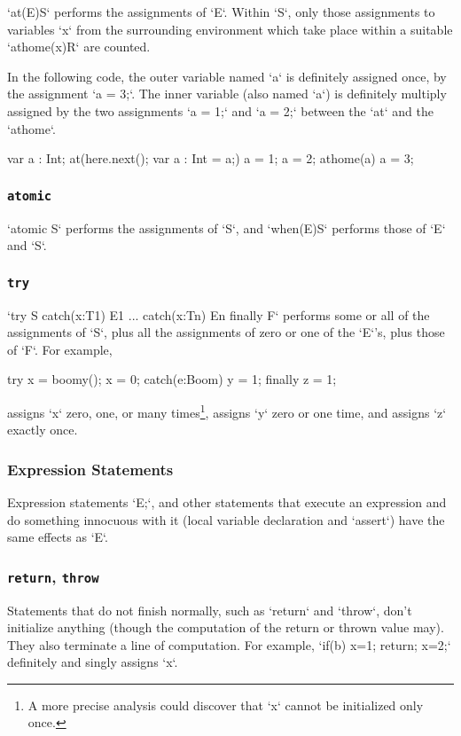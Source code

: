 \xcd`at(E)S` performs the assignments of \xcd`E`. Within \xcd`S`, only those
assignments to variables \xcd`x` from the surrounding environment which take
place within a suitable \xcd`athome(x)R` are counted. 

\begin{ex}
In the following code, the outer variable named \xcd`a` is definitely assigned
once, by the assignment \xcd`a = 3;`.  The inner variable (also named \xcd`a`)
is definitely multiply assigned 
by the two assignments \xcd`a = 1;` and \xcd`a = 2;` 
between the \xcd`at` and the \xcd`athome`.  
\begin{xten}
var a : Int;
at(here.next(); var a : Int = a;) {
  a = 1;
  a = 2; 
  athome(a) a = 3;
}
\end{xten}

\end{ex}

\subsubsection{{\tt atomic}}

\xcd`atomic S` performs the assignments of \xcd`S`, 
and \xcd`when(E)S` performs those of \xcd`E` and \xcd`S`.  

\subsubsection{{\tt try}}

\xcd`try S catch(x:T1) E1 ... catch(x:Tn) En  finally F` 
performs some or all of the assignments of \xcd`S`, plus all the assignments
of zero or one of the \xcd`E`'s, plus those of \xcd`F`.  
For example,
\begin{xten}
try {
  x = boomy();
  x = 0;
}
catch(e:Boom) { y = 1; }
finally { z = 1; }
\end{xten}
\noindent 
assigns \xcd`x` zero, one, or many times\footnote{A more precise
analysis could discover that \xcd`x` cannot be initialized only once.}, 
assigns \xcd`y` zero or one time, and assigns \xcd`z` exactly once.

\subsubsection{Expression Statements}

Expression statements \xcd`E;`, and other statements that execute an
expression and do something innocuous with it (local variable declaration and
\xcd`assert`) have the same effects as \xcd`E`. 

\subsubsection{{\tt return}, {\tt throw}}

Statements that do not finish normally, such as \xcd`return` and \xcd`throw`,
don't initialize anything (though the computation of the return or thrown
value may).    They also terminate a line of computation.  For example, 
\xcd`if(b) {x=1; return;}  x=2;` definitely and singly assigns \xcd`x`.  

